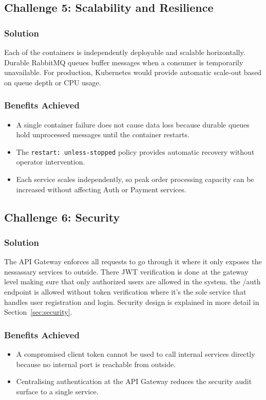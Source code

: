 \subsection{Challenge 5: Scalability and Resilience}
\label{subsec:challenge5}

\subsubsection{Solution}

Each of the containers is independently deployable and scalable horizontally. Durable RabbitMQ queues buffer messages when a consumer is temporarily unavailable. For production, Kubernetes would provide automatic scale-out based on queue depth or CPU usage.

\subsubsection{Benefits Achieved}

\begin{itemize}
    \item A single container failure does not cause data loss because durable queues hold unprocessed messages until the container restarts.
    \item The \texttt{restart: unless-stopped} policy provides automatic recovery without operator intervention.
    \item Each service scales independently, so peak order processing capacity can be increased without affecting Auth or Payment services.
\end{itemize}

\subsection{Challenge 6: Security}
\label{subsec:challenge6}

\subsubsection{Solution}

The API Gateway enforces all requests to go through it where it only exposes the nessassary services to outside. There JWT verification is done at the gateway level making sure that only authorized users are allowed in the system. the /auth endpoint is allowed without token verification where it's the sole service that handles user registration and login. Security design is explained in more detail in Section~\ref{sec:security}.

\subsubsection{Benefits Achieved}

\begin{itemize}
    \item A compromised client token cannot be used to call internal services directly because no internal port is reachable from outside.
    \item Centralising authentication at the API Gateway reduces the security audit surface to a single service.
\end{itemize}


